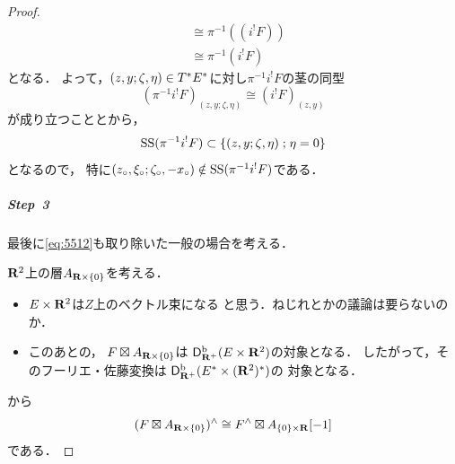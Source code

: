 \begin{proof}
\begin{align*}
        &\cong
        \pi^{-1}((i^{!}F))\\
        &\cong
        \pi^{-1}(i^{!}F)
    \end{align*}
    となる．
    よって，\((z,y;\zeta,\eta)\in\cotb[E^{\ast}]\)に対し\(
        \pi^{-1}i^{!}F
    \)の茎の同型\[
        (\pi^{-1}i^{!}F)_{(z,y;\zeta,\eta)}
        \cong
        (i^{!}F)_{(z,y)}
    \]が成り立つことと\cite[Prop.5.4.5 (ii)]{KS90}から，
    \[
        \muS(\pi^{-1}i^{!}F)
        \subset
        \left\{(z,y;\zeta,\eta)\mathrel{;}\eta=0\right\}
    \]
    となるので，
    特に\(
        (z_{\circ},\xi_{\circ};\zeta_{\circ},-x_{\circ})
        \notin
        \muS(\pi^{-1}i^{!}F)
    \)である．
    \subparagraph{Step~3}%
    最後に\eqref{eq:5512}も取り除いた一般の場合を考える．

    \(\rr^{2}\)上の層\(A_{\rr\times\left\{0\right\}}\)を考える．
    \begin{CMT*}
        \begin{itemize}
            \item \(E\times \rr^2\)は\(Z\)上のベクトル束になる
            と思う．ねじれとかの議論は要らないのか．
            \item このあとの，
            \(F\etens A_{\rr\times\left\{0\right\}}\)は
            \(\Dbconic(E\times \rr^2)\)の対象となる．
            したがって，そのフーリエ・佐藤変換は
            \(\Dbconic(E^{\ast}\times (\rr^2)^{\ast})\)の
            対象となる．
        \end{itemize}        
    \end{CMT*}
    \cite[Prop.3.7.15]{KS90}から
    \begin{equation}
        (F\etens A_{\rr\times\left\{0\right\}})^{\wedge}
        \cong
        F^{\wedge}\etens A_{\left\{0\right\}\times\rr}[-1]
    \end{equation}
    である．

\end{proof}























